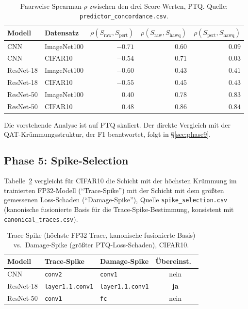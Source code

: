 \begin{table}[t]
\centering
\small
\caption{Paarweise Spearman-$\rho$ zwischen den drei Score-Werten, PTQ. Quelle: \texttt{predictor\_concordance.csv}.}
\label{tab:concordance}
\begin{tabular}{llrrr}
\toprule
Modell & Datensatz & $\rho(S_{\mathrm{raw}},S_{\mathrm{pert}})$ & $\rho(S_{\mathrm{raw}},S_{\mathrm{hawq}})$ & $\rho(S_{\mathrm{pert}},S_{\mathrm{hawq}})$ \\
\midrule
CNN & ImageNet100 & $-0.71$ & $0.60$ & $0.09$ \\
CNN & CIFAR10 & $-0.54$ & $0.71$ & $0.03$ \\
ResNet-18 & ImageNet100 & $-0.60$ & $0.43$ & $0.41$ \\
ResNet-18 & CIFAR10 & $-0.55$ & $0.45$ & $0.43$ \\
ResNet-50 & ImageNet100 & $0.40$ & $0.78$ & $\mathbf{0.83}$ \\
ResNet-50 & CIFAR10 & $0.48$ & $0.86$ & $\mathbf{0.84}$ \\
\bottomrule
\end{tabular}
\end{table}

Die vorstehende Analyse ist auf PTQ skaliert. Der direkte Vergleich mit der QAT-Krümmungsstruktur, der F1 beantwortet, folgt in \S\ref{sec:phase9}.

\subsection{Phase 5: Spike-Selection}
\label{sec:phase5}

Tabelle~\ref{tab:spike} vergleicht für CIFAR10 die Schicht mit der höchsten Krümmung im trainierten FP32-Modell (\enquote{Trace-Spike}) mit der Schicht mit dem größten gemessenen Loss-Schaden (\enquote{Damage-Spike}), Quelle \texttt{spike\_selection.csv} (kanonische fusionierte Basis für die Trace-Spike-Bestimmung, konsistent mit \texttt{canonical\_traces.csv}).

\begin{table}[t]
\centering
\small
\caption{Trace-Spike (höchste FP32-Trace, kanonische fusionierte Basis) vs.\ Damage-Spike (größter PTQ-Loss-Schaden), CIFAR10.}
\label{tab:spike}
\begin{tabular}{lllc}
\toprule
Modell & Trace-Spike & Damage-Spike & Übereinst.\ \\
\midrule
CNN & \texttt{conv2} & \texttt{conv1} & nein \\
ResNet-18 & \texttt{layer1.1.conv1} & \texttt{layer1.1.conv1} & \textbf{ja} \\
ResNet-50 & \texttt{conv1} & \texttt{fc} & nein \\
\bottomrule
\end{tabular}
\end{table}

